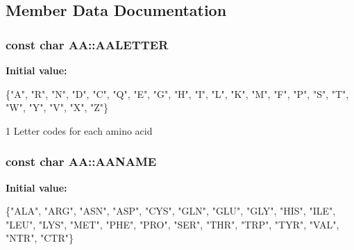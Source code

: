 \subsection{Member Data Documentation}
\hypertarget{classAA_ad31fab7fcd16661c068535ca46524a6a}{
\subsubsection[{A\-A\-L\-E\-T\-T\-E\-R}]{\setlength{\rightskip}{0pt plus 5cm}const char A\-A\-::\-A\-A\-L\-E\-T\-T\-E\-R\hspace{0.3cm}{\ttfamily [static]}}}\label{classAA_ad31fab7fcd16661c068535ca46524a6a}
{\bfseries Initial value\-:}
\begin{DoxyCode}
 \{\textcolor{stringliteral}{"A"}, \textcolor{stringliteral}{"R"}, \textcolor{stringliteral}{"N"}, \textcolor{stringliteral}{"D"}, \textcolor{stringliteral}{"C"}, \textcolor{stringliteral}{"Q"}, \textcolor{stringliteral}{"E"}, \textcolor{stringliteral}{"G"}, 
                   \textcolor{stringliteral}{"H"}, \textcolor{stringliteral}{"I"}, \textcolor{stringliteral}{"L"}, \textcolor{stringliteral}{"K"}, \textcolor{stringliteral}{"M"}, \textcolor{stringliteral}{"F"}, \textcolor{stringliteral}{"P"}, \textcolor{stringliteral}{"S"}, 
                   \textcolor{stringliteral}{"T"}, \textcolor{stringliteral}{"W"}, \textcolor{stringliteral}{"Y"}, \textcolor{stringliteral}{"V"}, \textcolor{stringliteral}{"X"}, \textcolor{stringliteral}{"Z"}\}
\end{DoxyCode}


1 Letter codes for each amino acid 

\hypertarget{classAA_a979027b32adbcc9f5eabeaf580d243b6}{
\subsubsection[{A\-A\-N\-A\-M\-E}]{\setlength{\rightskip}{0pt plus 5cm}const char A\-A\-::\-A\-A\-N\-A\-M\-E\hspace{0.3cm}{\ttfamily [static]}}}\label{classAA_a979027b32adbcc9f5eabeaf580d243b6}
{\bfseries Initial value\-:}
\begin{DoxyCode}
 \{\textcolor{stringliteral}{"ALA"}, \textcolor{stringliteral}{"ARG"}, \textcolor{stringliteral}{"ASN"}, \textcolor{stringliteral}{"ASP"}, \textcolor{stringliteral}{"CYS"}, \textcolor{stringliteral}{"GLN"}, 
                 \textcolor{stringliteral}{"GLU"}, \textcolor{stringliteral}{"GLY"}, \textcolor{stringliteral}{"HIS"}, \textcolor{stringliteral}{"ILE"}, \textcolor{stringliteral}{"LEU"}, \textcolor{stringliteral}{"LYS"}, 
                 \textcolor{stringliteral}{"MET"}, \textcolor{stringliteral}{"PHE"}, \textcolor{stringliteral}{"PRO"}, \textcolor{stringliteral}{"SER"}, \textcolor{stringliteral}{"THR"}, \textcolor{stringliteral}{"TRP"}, 
                 \textcolor{stringliteral}{"TYR"}, \textcolor{stringliteral}{"VAL"}, \textcolor{stringliteral}{"NTR"}, \textcolor{stringliteral}{"CTR"}\}
\end{DoxyCode}


